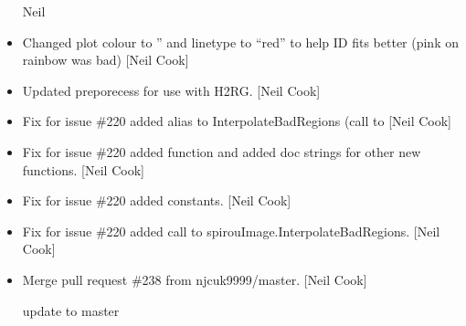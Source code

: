 \documentclass[a4paper,10pt,english]{report}
\begin{document}
\begin{itemize}
Neil

\item {} 
Changed plot colour to ” and linetype to “red” to help ID
fits better (pink on rainbow was bad) {[}Neil Cook{]}

\item {} 
Updated preporecess for use with H2RG. {[}Neil Cook{]}

\item {} 
Fix for issue \#220 \sphinxhyphen{} added alias to InterpolateBadRegions (call to
 {[}Neil Cook{]}

\item {} 
Fix for issue \#220 \sphinxhyphen{} added  function and added doc
strings for other new functions. {[}Neil Cook{]}

\item {} 
Fix for issue \#220 \sphinxhyphen{} added  constants. {[}Neil Cook{]}

\item {} 
Fix for issue \#220 \sphinxhyphen{} added call to spirouImage.InterpolateBadRegions.
{[}Neil Cook{]}

\item {} 
Merge pull request \#238 from njcuk9999/master. {[}Neil Cook{]}

update to master

\end{itemize}
\end{document}
